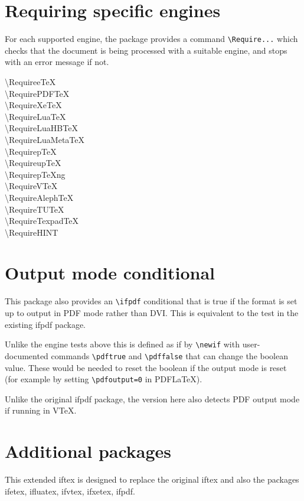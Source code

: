 \documentclass{article}
\newcommand\cs[1]{{\ttfamily\textbackslash #1}}
\begin{document}
\section{Requiring specific engines}
For each supported engine, the package provides a command
\verb|\Require...| which checks that the document is being processed
with a suitable engine, and stops with an error message if not.

\begin{description}
\item[\cs{RequireeTeX}]
\item[\cs{RequirePDFTeX}]
\item[\cs{RequireXeTeX}]
\item[\cs{RequireLuaTeX}]
\item[\cs{RequireLuaHBTeX}]
\item[\cs{RequireLuaMetaTeX}]
\item[\cs{RequirepTeX}]
\item[\cs{RequireupTeX}]
\item[\cs{RequirepTeXng}]
\item[\cs{RequireVTeX}]
\item[\cs{RequireAlephTeX}]
\item[\cs{RequireTUTeX}]
\item[\cs{RequireTexpadTeX}]
\item[\cs{RequireHINT}]
\end{description}


\section{Output mode conditional}
This package also provides an \verb|\ifpdf| conditional that is true
if the format is set up to output in PDF mode rather than DVI. This is
equivalent to the test in the existing \textsf{ifpdf} package.

Unlike the engine tests above this is defined as if by \verb|\newif|
with user-documented commands \verb|\pdftrue| and \verb|\pdffalse| that can
change the boolean value. These would be needed to reset the boolean
if the output mode is reset (for example by setting
\verb|\pdfoutput=0| in PDF\LaTeX).

Unlike the original \textsf{ifpdf} package, the version here also
detects PDF output mode if running in V\TeX.

\section{Additional packages}
This extended \textsf{iftex} is designed to replace the original
\textsf{iftex} and also the packages
\textsf{ifetex},
\textsf{ifluatex},
\textsf{ifvtex},
\textsf{ifxetex},
\textsf{ifpdf}.
\end{document}
